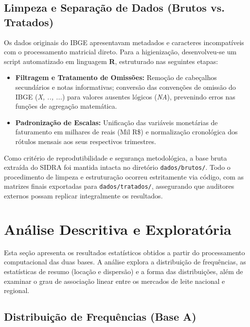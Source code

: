 \documentclass[12pt,a4paper]{article}
\begin{document}
\subsection{Limpeza e Separação de Dados (Brutos vs. Tratados)}
Os dados originais do IBGE apresentavam metadados e caracteres incompatíveis com o processamento matricial direto. Para a higienização, desenvolveu-se um script automatizado em linguagem \textbf{R}, estruturado nas seguintes etapas:

\begin{itemize}
    \item \textbf{Filtragem e Tratamento de Omissões:} Remoção de cabeçalhos secundários e notas informativas; conversão das convenções de omissão do IBGE (\textit{X, .., ...}) para valores ausentes lógicos (\textit{NA}), prevenindo erros nas funções de agregação matemática.
    \item \textbf{Padronização de Escalas:} Unificação das variáveis monetárias de faturamento em milhares de reais (Mil R\$) e normalização cronológica dos rótulos mensais aos seus respectivos trimestres.
\end{itemize}

Como critério de reprodutibilidade e segurança metodológica, a base bruta extraída do SIDRA foi mantida intacta no diretório \texttt{dados/brutos/}. Todo o procedimento de limpeza e estruturação ocorreu estritamente via código, com as matrizes finais exportadas para \texttt{dados/tratados/}, assegurando que auditores externos possam replicar integralmente os resultados.

\section{Análise Descritiva e Exploratória}
\label{sec:analise_descritiva}

Esta seção apresenta os resultados estatísticos obtidos a partir do processamento computacional das duas bases. A análise explora a distribuição de frequências, as estatísticas de resumo (locação e dispersão) e a forma das distribuições, além de examinar o grau de associação linear entre os mercados de leite nacional e regional.

\subsection{Distribuição de Frequências (Base A)}
\end{document}
